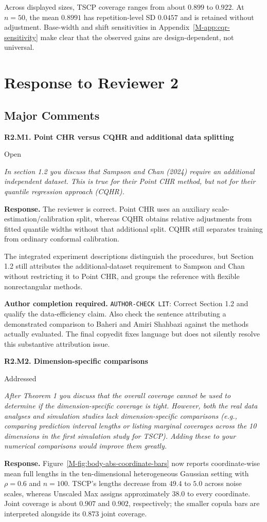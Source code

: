 \documentclass[11pt]{article}
\newcommand{\msapp}[1]{Appendix~\ref*{M-#1}}
\newcommand{\msfig}[1]{Figure~\ref*{M-#1}}
\newcommand{\action}[1]{\par{\small\color{ActionRed}\textbf{Author completion required.} #1\par}}
\newcommand{\point}[3]{\par\Needspace{7\baselineskip}\medskip
\noindent\parbox[t]{0.77\linewidth}{\textbf{#1}}\hfill
\parbox[t]{0.21\linewidth}{\raggedleft\small\sffamily #2}\par\nopagebreak
{\color{ReviewerBlue}\small\itshape #3\par}\textbf{Response.} }
\begin{document}
Across displayed sizes, TSCP coverage ranges from about $0.899$ to $0.922$. At $n=50$, the mean $0.8991$ has repetition-level SD $0.0457$ and is retained without adjustment. Base-width and shift sensitivities in \msapp{app:cqr-sensitivity} make clear that the observed gains are design-dependent, not universal.

\clearpage
\section*{Response to Reviewer 2}
\subsection*{Major Comments}

\point{R2.M1. Point CHR versus CQHR and additional data splitting}{Open}{In section 1.2 you discuss that Sampson and Chan (2024) require an
additional independent dataset. This is true for their Point CHR
method, but not for their quantile regression approach (CQHR).}
\label{response:R2.M1}
The reviewer is correct. Point CHR uses an auxiliary scale-estimation/calibration split, whereas CQHR obtains relative adjustments from fitted quantile widths without that additional split. CQHR still separates training from ordinary conformal calibration.

The integrated experiment descriptions distinguish the procedures, but Section 1.2 still attributes the additional-dataset requirement to Sampson and Chan without restricting it to Point CHR, and groups the reference with flexible nonrectangular methods.

\action{\texttt{AUTHOR-CHECK LIT}: Correct Section 1.2 and qualify the data-efficiency claim. Also check the sentence attributing a demonstrated comparison to Baheri and Amiri Shahbazi against the methods actually evaluated. The final copyedit fixes language but does not silently resolve this substantive attribution issue.}

\point{R2.M2. Dimension-specific comparisons}{Addressed}{After Theorem 1 you discuss that the overall coverage cannot be used
to determine if the dimension-specific coverage is tight. However,
both the real data analyses and simulation studies lack
dimension-specific comparisons (e.g., comparing prediction interval
lengths or listing marginal coverages across the 10 dimensions in
the first simulation study for TSCP). Adding these to your numerical
comparisons would improve them greatly.}
\label{response:R2.M2}
\msfig{fig:body-abs-coordinate-bars} now reports coordinate-wise mean full lengths in the ten-dimensional heterogeneous Gaussian setting with $\rho=0.6$ and $n=100$. TSCP's lengths decrease from $49.4$ to $5.0$ across noise scales, whereas Unscaled Max assigns approximately $38.0$ to every coordinate. Joint coverage is about $0.907$ and $0.902$, respectively; the smaller copula bars are interpreted alongside its $0.873$ joint coverage.
\end{document}
